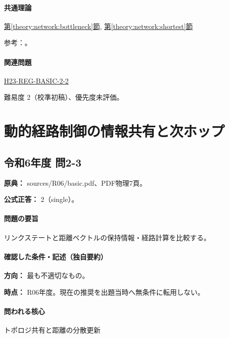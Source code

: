 \paragraph{共通理論} \hyperref[theory:network:bottleneck]{第\ref*{theory:network:bottleneck}節}, \hyperref[theory:network:shortest]{第\ref*{theory:network:shortest}節}

\par 参考：\cite{net_dijkstra}。

\paragraph{関連問題} \hyperref[q:h23-reg-basic-2-2]{H23-REG-BASIC-2-2}

\par 難易度 2（校準初稿）、優先度未評価。

\section{動的経路制御の情報共有と次ホップ}

\subsection{令和6年度 問2-3}
\label{q:r06-reg-basic-2-3}

\noindent\textbf{原典：} sources/R06/basic.pdf、PDF物理7頁。

\textbf{公式正答：} 2（single）。

\paragraph{問題の要旨} リンクステートと距離ベクトルの保持情報・経路計算を比較する。

\paragraph{確認した条件・記述（独自要約）}\mbox{}\par

\noindent\textbf{方向：} 最も不適切なもの。\par

\noindent\textbf{時点：} R06年度。現在の推奨を出題当時へ無条件に転用しない。\par

\paragraph{問われる核心} トポロジ共有と距離の分散更新

